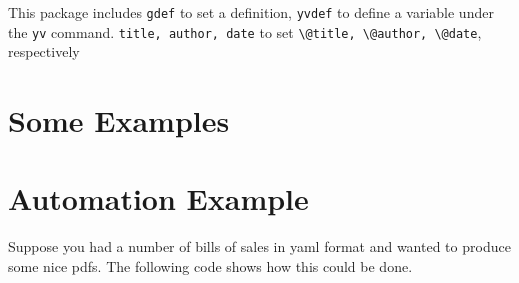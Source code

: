 \documentclass[11pt,parskip=half]{scrartcl}
\begin{document}
This package includes \texttt{gdef} to set a definition, \texttt{yvdef} to define a variable under the \texttt{yv} command.
\texttt{title, author, date} to set \texttt{\textbackslash @title, \textbackslash @author, \textbackslash @date},
respectively

\pagebreak

\section{Some Examples}


\pagebreak
    \section{Automation Example}\label{example}

    Suppose you had a number of bills of sales in yaml format and wanted to produce some nice pdfs.
    The following code shows how this could be done.

    \pagebreak
    \vspace*{-5em}
\end{document}
